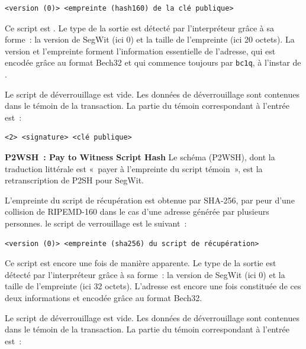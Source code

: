 \begin{Verbatim}[fontsize=\small]
<version (0)> <empreinte (hash160) de la clé publique>
\end{Verbatim}

Ce script est . Le type de la sortie est détecté par l'interpréteur grâce à sa forme~: la version de SegWit (ici 0) et la taille de l'empreinte (ici 20 octets). La version et l'empreinte forment l'information essentielle de l'adresse, qui est encodée grâce au format Bech32 et qui commence toujours par \texttt{bc1q}, à l'instar de .

Le script de déverrouillage est vide. Les données de déverrouillage sont contenues dans le témoin de la transaction. La partie du témoin correspondant à l'entrée est~:

\begin{Verbatim}[fontsize=\small]
<2> <signature> <clé publique>
\end{Verbatim}

\textbf{P2WSH~: Pay to Witness Script Hash} Le schéma  (P2WSH), dont la traduction littérale est «~payer à l'empreinte du script témoin~», est la retranscription de P2SH pour SegWit.

L'empreinte du script de récupération est obtenue par SHA-256, par peur d'une collision de RIPEMD-160 dans le cas d'une adresse générée par plusieurs personnes. le script de verrouillage est le suivant~:

\begin{Verbatim}[fontsize=\small]
<version (0)> <empreinte (sha256) du script de récupération>
\end{Verbatim}

Ce script est encore une fois  de manière apparente. Le type de la sortie est détecté par l'interpréteur grâce à sa forme~: la version de SegWit (ici 0) et la taille de l'empreinte (ici 32 octets). L'adresse est encore une fois constituée de ces deux informations et encodée grâce au format Bech32.

Le script de déverrouillage est vide. Les données de déverrouillage sont contenues dans le témoin de la transaction. La partie du témoin correspondant à l'entrée est~:

